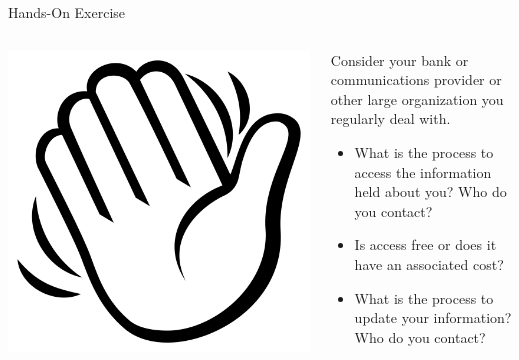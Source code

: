 \documentclass[ignorenonframetext,xcolor=x11names]{beamer}
\begin{document}
\begin{frame}{Hands-On Exercise}
\begin{columns}
\begin{column}{0.2\textwidth}
\href{https://commons.wikimedia.org/wiki/File:Emojione_BW_1F44B.svg}{\includegraphics[width=\textwidth]{hand.png}}
\end{column}
\begin{column}{0.8\textwidth}
Consider your bank or communications provider or other large organization you regularly deal with. 
\begin{itemize}
  \item What is the process to access the information held about you? Who do you contact?
  \item Is access free or does it have an associated cost?
  \item What is the process to update your information? Who do you contact?
\end{itemize}
\end{column}
\end{columns}
\end{frame}
\end{document}
